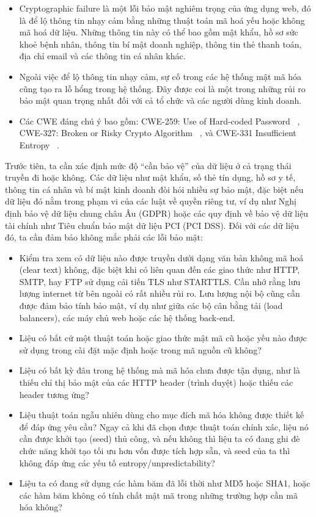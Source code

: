 \begin{itemize}
    \item Cryptographic failure là một lỗi bảo mật nghiêm trọng của ứng dụng web, đó là để lộ thông tin nhạy cảm bằng những thuật toán mã hoá yếu hoặc không mã hoá dữ liệu. Những thông tin này có thể bao gồm mật khẩu, hồ sơ sức khoẻ bệnh nhân, thông tin bí mật doanh nghiệp, thông tin thẻ thanh toán, địa chỉ email và các thông tin cá nhân khác.
    \item Ngoài việc để lộ thông tin nhạy cảm, sự cố trong các hệ thống mật mã hóa cũng tạo ra lỗ hổng trong hệ thống. Đây được coi là một trong những rủi ro bảo mật quan trọng nhất đối với cả tổ chức và các người dùng kinh doanh.
    \item Các CWE đáng chú ý bao gồm: CWE-259: Use of Hard-coded Password ~\cite{chap2bib9}, CWE-327: Broken or Risky Crypto Algorithm ~\cite{chap2bib10}, và CWE-331 Insufficient Entropy ~\cite{chap2bib11}.
\end{itemize}

\tab \tab Trước tiên, ta cần xác định mức độ “cần bảo vệ” của dữ liệu ở cả trạng thái truyền đi hoặc không. Các dữ liệu như mật khẩu, số thẻ tín dụng, hồ sơ y tế, thông tin cá nhân và bí mật kinh doanh đòi hỏi nhiều sự bảo mật, đặc biệt nếu dữ liệu đó nằm trong phạm vi của các luật về quyền riêng tư, ví dụ như Nghị định bảo vệ dữ liệu chung châu Âu (GDPR) hoặc các quy định về bảo vệ dữ liệu tài chính như Tiêu chuẩn bảo mật dữ liệu PCI (PCI DSS). Đối với các dữ liệu đó, ta cần đảm bảo không mắc phải các lỗi bảo mật:

\begin{itemize}
    \item Kiểm tra xem có dữ liệu nào được truyền dưới dạng văn bản không mã hoá (clear text) không, đặc biệt khi có liên quan đến các giao thức như HTTP, SMTP, hay FTP sử dụng cải tiến TLS như STARTTLS. Cần nhớ rằng lưu lượng internet từ bên ngoài có rất nhiều rủi ro. Lưu lượng nội bộ cũng cần được đảm bảo tính bảo mật, ví dụ như giữa các bộ cân bằng tải (load balancers), các máy chủ web hoặc các hệ thống back-end.
    \item Liệu có bất cứ một thuật toán hoặc giao thức mật mã cũ hoặc yếu nào được sử dụng trong cài đặt mặc định hoặc trong mã nguồn cũ không?
    \item Liệu có bất kỳ đâu trong hệ thống mà mã hóa chưa được tận dụng, như là thiếu chỉ thị bảo mật của các HTTP header (trình duyệt) hoặc thiếu các header tương ứng?
    \item Liệu thuật toán ngẫu nhiên dùng cho mục đích mã hóa không được thiết kế để đáp ứng yêu cầu? Ngay cả khi đã chọn được thuật toán chính xác, liệu nó cần được khởi tạo (seed) thủ công, và nếu không thì liệu ta có đang ghi đè chức năng khởi tạo tối ưu hơn vốn được tích hợp sẵn, và seed của ta thì không đáp ứng các yếu tố entropy/unpredictability?
    \item Liệu ta có đang sử dụng các hàm băm đã lỗi thời như MD5 hoặc SHA1, hoặc các hàm băm không có tính chất mật mã trong những trường hợp cần mã hóa không?
\end{itemize}

